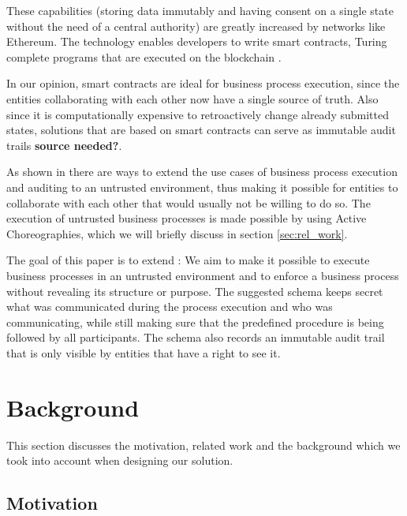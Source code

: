 \documentclass[runningheads]{llncs}
\begin{document}
These capabilities (storing data immutably and having consent on a single state without the need of a  central authority) are greatly increased by networks like Ethereum. The technology enables developers to write smart contracts, Turing complete programs that are executed on the blockchain \cite{buterin2014next}.

In our opinion, smart contracts are ideal for business process execution, since the entities collaborating with each other now have a single source of truth. Also since it is computationally expensive to retroactively change already submitted states, solutions that are based on smart contracts can serve as immutable audit trails \textbf{source needed?}.

As shown in \cite{weber2016untrusted} there are ways to extend the use cases of business process execution and auditing to an untrusted environment, thus making it possible for entities to collaborate with each other that would usually not be  willing to do so. The execution of untrusted business processes is made possible by using Active Choreographies, which we will briefly discuss in section \ref{sec:rel_work}.

The goal of this paper is to extend \cite{weber2016untrusted}: We aim to make it possible to execute business processes in an untrusted environment and to enforce a business process without revealing its structure or purpose. The suggested schema keeps secret what was communicated during the process execution and who was communicating, while still making sure that the predefined procedure is being followed by all participants. The schema also records an immutable audit trail that is only visible by entities that have a right to see it. 



\section{Background} \label{sec:background}

This section discusses the motivation, related work and the background which we took into account when designing our solution.


\subsection{Motivation} \label{sec:motivation}
\end{document}
